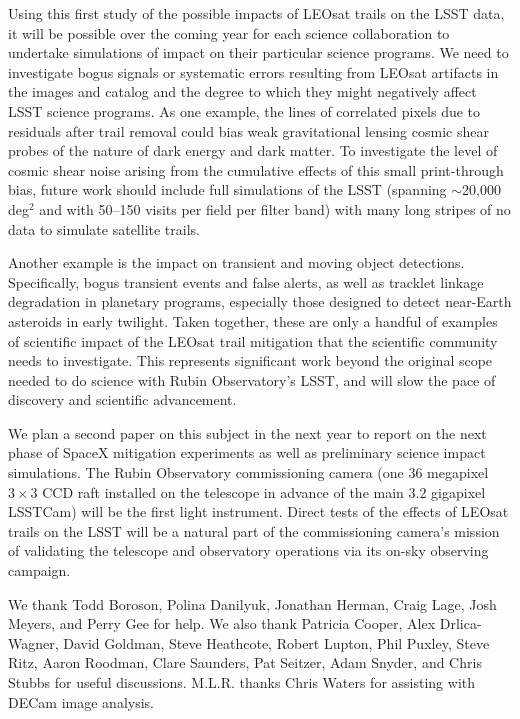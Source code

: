 \documentclass[twocolumn,trackchanges]{aastex63}
\begin{document}
Using this first study of the possible impacts of LEOsat trails on the LSST data, it will be possible over the coming year for each science collaboration to undertake simulations of impact on their particular science programs.
We need to investigate bogus signals or systematic errors resulting from LEOsat artifacts in the images and catalog and the degree to which they might negatively affect LSST science programs. As one example, the lines of correlated pixels due to residuals after trail removal could bias weak gravitational lensing cosmic shear probes of the nature of dark energy and dark matter. To investigate the level of cosmic shear noise arising from the cumulative effects of this small print-through bias, future work should include full simulations of the LSST (spanning $\sim$20,000 deg$^2$ and with 50--150 visits per field per filter band) with many long stripes of no data to simulate satellite trails.

Another example is the impact on transient and moving object detections. Specifically, bogus transient events and false alerts, as well as tracklet linkage degradation in planetary programs, especially those designed to detect near-Earth asteroids in early twilight. Taken together, these are only a handful of examples of scientific impact of the LEOsat trail mitigation that the scientific community needs to investigate. This represents significant work beyond the original scope needed to do science with Rubin Observatory's LSST, and will slow the pace of discovery and scientific advancement.

We plan a second paper on this subject in the next year to report on the next phase of SpaceX mitigation experiments as well as preliminary science impact simulations. The Rubin Observatory commissioning camera (one 36 megapixel $3\times3$ CCD raft installed on the telescope in advance of the main 3.2 gigapixel LSSTCam) will be the first light instrument. Direct tests of the effects of LEOsat trails on the LSST will be a natural part of the commissioning camera's mission of validating the telescope and observatory operations via its on-sky observing campaign.


\acknowledgments

We thank Todd Boroson, Polina Danilyuk, Jonathan Herman, Craig Lage, Josh Meyers, and Perry Gee for help. We also thank Patricia Cooper, Alex Drlica-Wagner, David Goldman, Steve Heathcote, Robert Lupton, Phil Puxley, Steve Ritz, Aaron Roodman, Clare Saunders, Pat Seitzer, Adam Snyder, and Chris Stubbs for useful discussions. M.L.R. thanks Chris Waters for assisting with DECam image analysis.
\end{document}
